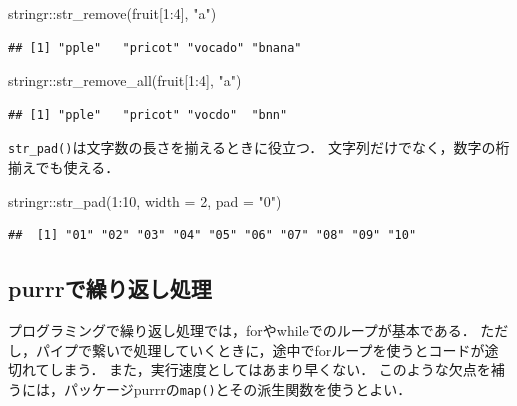 \documentclass[
]{article}
\newenvironment{Shaded}{\begin{snugshade}}{\end{snugshade}}
\newcommand{\AttributeTok}[1]{\textcolor[rgb]{0.77,0.63,0.00}{#1}}
\newcommand{\DecValTok}[1]{\textcolor[rgb]{0.00,0.00,0.81}{#1}}
\newcommand{\FunctionTok}[1]{\textcolor[rgb]{0.00,0.00,0.00}{#1}}
\newcommand{\NormalTok}[1]{#1}
\newcommand{\SpecialCharTok}[1]{\textcolor[rgb]{0.00,0.00,0.00}{#1}}
\newcommand{\StringTok}[1]{\textcolor[rgb]{0.31,0.60,0.02}{#1}}
\begin{document}
\begin{Shaded}
\begin{Highlighting}[]
\NormalTok{stringr}\SpecialCharTok{::}\FunctionTok{str\_remove}\NormalTok{(fruit[}\DecValTok{1}\SpecialCharTok{:}\DecValTok{4}\NormalTok{], }\StringTok{"a"}\NormalTok{)}
\end{Highlighting}
\end{Shaded}

\begin{verbatim}
## [1] "pple"   "pricot" "vocado" "bnana"
\end{verbatim}

\begin{Shaded}
\begin{Highlighting}[]
\NormalTok{stringr}\SpecialCharTok{::}\FunctionTok{str\_remove\_all}\NormalTok{(fruit[}\DecValTok{1}\SpecialCharTok{:}\DecValTok{4}\NormalTok{], }\StringTok{"a"}\NormalTok{)}
\end{Highlighting}
\end{Shaded}

\begin{verbatim}
## [1] "pple"   "pricot" "vocdo"  "bnn"
\end{verbatim}

\texttt{str\_pad()}は文字数の長さを揃えるときに役立つ．
文字列だけでなく，数字の桁揃えでも使える．

\begin{Shaded}
\begin{Highlighting}[]
\NormalTok{stringr}\SpecialCharTok{::}\FunctionTok{str\_pad}\NormalTok{(}\DecValTok{1}\SpecialCharTok{:}\DecValTok{10}\NormalTok{, }\AttributeTok{width =} \DecValTok{2}\NormalTok{, }\AttributeTok{pad =} \StringTok{"0"}\NormalTok{)}
\end{Highlighting}
\end{Shaded}

\begin{verbatim}
##  [1] "01" "02" "03" "04" "05" "06" "07" "08" "09" "10"
\end{verbatim}

\hypertarget{purrr}{%
\subsection{purrrで繰り返し処理}\label{purrr}}

プログラミングで繰り返し処理では，forやwhileでのループが基本である．
ただし，パイプで繋いで処理していくときに，途中でforループを使うとコードが途切れてしまう．
また，実行速度としてはあまり早くない．
このような欠点を補うには，パッケージpurrrの\texttt{map()}とその派生関数を使うとよい．
\end{document}
